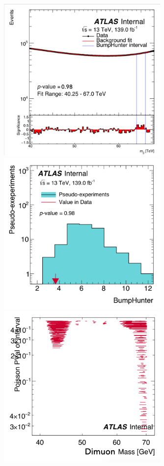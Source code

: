 \begin{itemize}
\begin{figure}[!htb]
    \begin{center}
        \includegraphics[width=0.75\textwidth]{figures/chapter_dimuon/Nominal}        
        \includegraphics[width=0.75\textwidth]{figures/chapter_dimuon/NominalBH}        
        \includegraphics[width=0.75\textwidth]{figures/chapter_dimuon/NominalFit}        

\end{center}
\end{figure}
\end{itemize}
